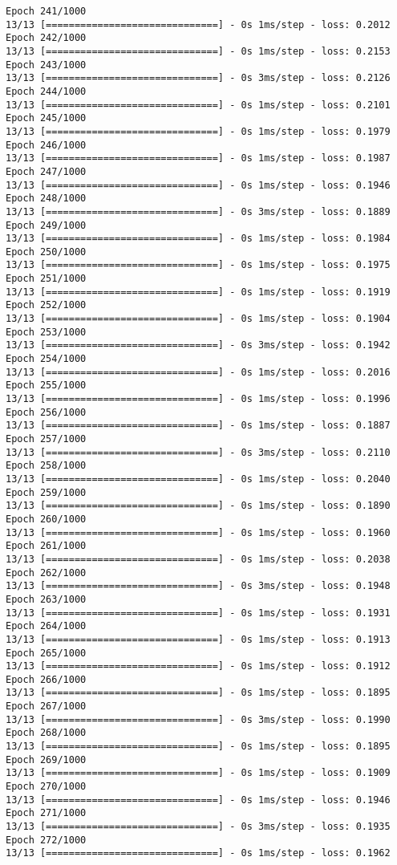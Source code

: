 \documentclass[11pt]{article}
\begin{document}
\begin{Verbatim}[commandchars=\\\{\}]
Epoch 241/1000
13/13 [==============================] - 0s 1ms/step - loss: 0.2012
Epoch 242/1000
13/13 [==============================] - 0s 1ms/step - loss: 0.2153
Epoch 243/1000
13/13 [==============================] - 0s 3ms/step - loss: 0.2126
Epoch 244/1000
13/13 [==============================] - 0s 1ms/step - loss: 0.2101
Epoch 245/1000
13/13 [==============================] - 0s 1ms/step - loss: 0.1979
Epoch 246/1000
13/13 [==============================] - 0s 1ms/step - loss: 0.1987
Epoch 247/1000
13/13 [==============================] - 0s 1ms/step - loss: 0.1946
Epoch 248/1000
13/13 [==============================] - 0s 3ms/step - loss: 0.1889
Epoch 249/1000
13/13 [==============================] - 0s 1ms/step - loss: 0.1984
Epoch 250/1000
13/13 [==============================] - 0s 1ms/step - loss: 0.1975
Epoch 251/1000
13/13 [==============================] - 0s 1ms/step - loss: 0.1919
Epoch 252/1000
13/13 [==============================] - 0s 1ms/step - loss: 0.1904
Epoch 253/1000
13/13 [==============================] - 0s 3ms/step - loss: 0.1942
Epoch 254/1000
13/13 [==============================] - 0s 1ms/step - loss: 0.2016
Epoch 255/1000
13/13 [==============================] - 0s 1ms/step - loss: 0.1996
Epoch 256/1000
13/13 [==============================] - 0s 1ms/step - loss: 0.1887
Epoch 257/1000
13/13 [==============================] - 0s 3ms/step - loss: 0.2110
Epoch 258/1000
13/13 [==============================] - 0s 1ms/step - loss: 0.2040
Epoch 259/1000
13/13 [==============================] - 0s 1ms/step - loss: 0.1890
Epoch 260/1000
13/13 [==============================] - 0s 1ms/step - loss: 0.1960
Epoch 261/1000
13/13 [==============================] - 0s 1ms/step - loss: 0.2038
Epoch 262/1000
13/13 [==============================] - 0s 3ms/step - loss: 0.1948
Epoch 263/1000
13/13 [==============================] - 0s 1ms/step - loss: 0.1931
Epoch 264/1000
13/13 [==============================] - 0s 1ms/step - loss: 0.1913
Epoch 265/1000
13/13 [==============================] - 0s 1ms/step - loss: 0.1912
Epoch 266/1000
13/13 [==============================] - 0s 1ms/step - loss: 0.1895
Epoch 267/1000
13/13 [==============================] - 0s 3ms/step - loss: 0.1990
Epoch 268/1000
13/13 [==============================] - 0s 1ms/step - loss: 0.1895
Epoch 269/1000
13/13 [==============================] - 0s 1ms/step - loss: 0.1909
Epoch 270/1000
13/13 [==============================] - 0s 1ms/step - loss: 0.1946
Epoch 271/1000
13/13 [==============================] - 0s 3ms/step - loss: 0.1935
Epoch 272/1000
13/13 [==============================] - 0s 1ms/step - loss: 0.1962

\end{Verbatim}
\end{document}
